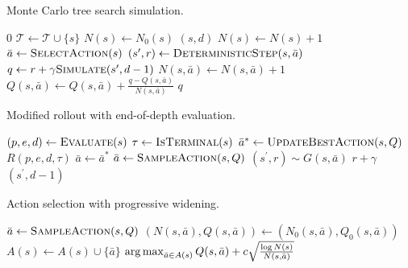 \begin{algorithm}[!ht]
  \captionsetup{font=small}
  \small
  \caption{Monte Carlo tree search simulation.}
  \label{alg:mcts-pw-simulate}
  \begin{algorithmic}
    \State \Return $0$
  \EndIf
    \State $\mathcal{T} \leftarrow \mathcal{T} \cup \{s\}$
    \State $N(s) \leftarrow N_0(s)$
    \State \Return {}$(s,d)$
  \EndIf
  \State $N(s) \leftarrow N(s) + 1$
  \State $\bar{a} \leftarrow \textproc{SelectAction}(s)$ 
  \State $(s^\prime, r) \leftarrow \textproc{DeterministicStep}(s,\bar{a})$ 
  \State $q \leftarrow r + \gamma \textproc{Simulate}(s^\prime, d-1)$ 
  \State $N(s,\bar{a}) \leftarrow N(s,\bar{a})+1$
  \State $Q(s,\bar{a}) \leftarrow Q(s,\bar{a})+\frac{q-Q(s,\bar{a})}{N(s,\bar{a})}$ 
  \State \Return $q$
  \EndFunction
  \end{algorithmic}
\end{algorithm}
%
\begin{algorithm}[!ht]
  \captionsetup{font=small}
  \small
  \caption{Modified rollout with end-of-depth evaluation.}
  \label{alg:mcts-pw-rollout}
  \begin{algorithmic}
    \State $(p, e, d) \leftarrow \textproc{Evaluate}(s)$
    \State $\tau \leftarrow \textproc{IsTerminal}(s)$
    \State $\bar{a}^* \leftarrow \textproc{UpdateBestAction}(s,Q)$
    \State \Return $R(p,e,d,\tau)$
    \State $\bar{a} \leftarrow \bar{a}^*$ 
  \Else
      \State $\bar{a} \leftarrow \textproc{SampleAction}(s,Q)$
  \EndIf
  \State $(s^\prime, r) \sim G(s,\bar{a})$
  \State \Return $r + \gamma$ $(s^\prime,d-1)$
  \EndFunction
  \end{algorithmic}
\end{algorithm}
%
\begin{algorithm}[!ht]
  \captionsetup{font=small}
  \small
  \caption{Action selection with progressive widening.}
  \label{alg:mcts-pw-action-widen}
  \begin{algorithmic}
    \State $\bar{a} \leftarrow \textproc{SampleAction}(s,Q)$
    \State $(N(s,\bar{a}), Q(s,\bar{a})) \leftarrow (N_0(s,\bar{a}), Q_0(s,\bar{a}))$
    \State $A(s) \leftarrow A(s) \cup \{\bar{a}\}$
  \EndIf
  \State \Return $\argmax_{\bar{a} \in A(s)} Q(s,\bar{a}) + c\sqrt{\frac{\log N(s)}{N(s,\bar{a})}}$
  \EndFunction
  \end{algorithmic}
\end{algorithm}
